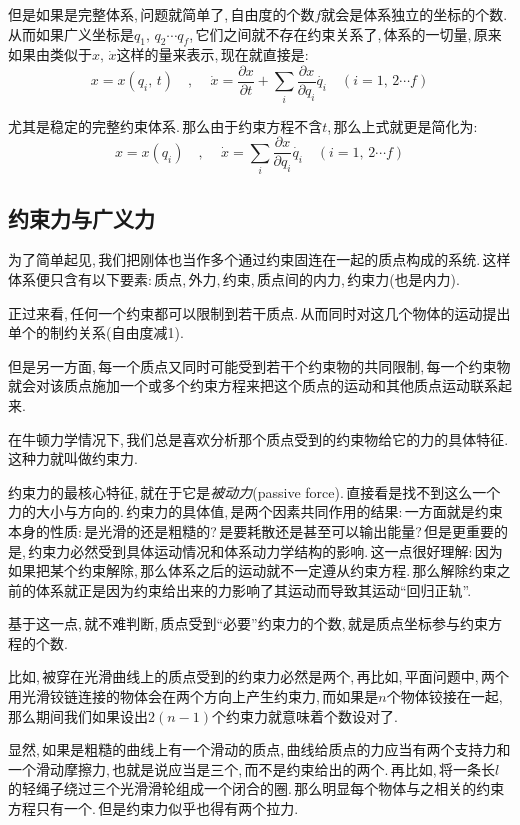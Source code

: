 但是如果是完整体系,\,问题就简单了,\,自由度的个数$f$就会是体系独立的坐标的个数.\,从而如果广义坐标是$q_1,\,q_2\cdots q_f$,\,它们之间就不存在约束关系了,\,体系的一切量,\,原来如果由类似于$x,\,\dot{x}$这样的量来表示,\,现在就直接是:
\[x=x(q_i,\,t)\quad,\,\quad \dot{x}=\frac{\partial x}{\partial t}+\sum_i \frac{\partial x}{\partial q_i}\dot{q_i}\quad (i=1,\,2\cdots f)\]

尤其是稳定的完整约束体系.\,那么由于约束方程不含$t$,\,那么上式就更是简化为:
\[x=x(q_i)\quad,\,\quad \dot{x}=\sum_i \frac{\partial x}{\partial q_i}\dot{q_i}\quad (i=1,\,2\cdots f)\]



\subsection{约束力与广义力}

为了简单起见,\,我们把刚体也当作多个通过约束固连在一起的质点构成的系统.\,这样体系便只含有以下要素:\,质点,\,外力,\,约束,\,质点间的内力,\,约束力(也是内力).

正过来看,\,任何一个约束都可以限制到若干质点.\,从而同时对这几个物体的运动提出单个的制约关系(自由度减1).

但是另一方面,\,每一个质点又同时可能受到若干个约束物的共同限制,\,每一个约束物就会对该质点施加一个或多个约束方程来把这个质点的运动和其他质点运动联系起来.

在牛顿力学情况下,\,我们总是喜欢分析那个质点受到的约束物给它的力的具体特征.\,这种力就叫做约束力.

约束力的最核心特征,\,就在于它是\emph{被动力}(passive force).\,直接看是找不到这么一个力的大小与方向的.\,约束力的具体值,\,是两个因素共同作用的结果:\,一方面就是约束本身的性质:\,是光滑的还是粗糙的?\,是要耗散还是甚至可以输出能量?\,但是更重要的是,\,约束力必然受到具体运动情况和体系动力学结构的影响.\,这一点很好理解:\,因为如果把某个约束解除,\,那么体系之后的运动就不一定遵从约束方程.\,那么解除约束之前的体系就正是因为约束给出来的力影响了其运动而导致其运动``回归正轨''.

基于这一点,\,就不难判断,\,质点受到``必要''约束力的个数,\,就是质点坐标参与约束方程的个数.

比如,\,被穿在光滑曲线上的质点受到的约束力必然是两个,\,再比如,\,平面问题中,\,两个用光滑铰链连接的物体会在两个方向上产生约束力,\,而如果是$n$个物体铰接在一起,\,那么期间我们如果设出$2(n-1)$个约束力就意味着个数设对了.


显然,\,如果是粗糙的曲线上有一个滑动的质点,\,曲线给质点的力应当有两个支持力和一个滑动摩擦力,\,也就是说应当是三个,\,而不是约束给出的两个.\,再比如,\,将一条长$l$的轻绳子绕过三个光滑滑轮组成一个闭合的圈.\,那么明显每个物体与之相关的约束方程只有一个.\,但是约束力似乎也得有两个拉力.

